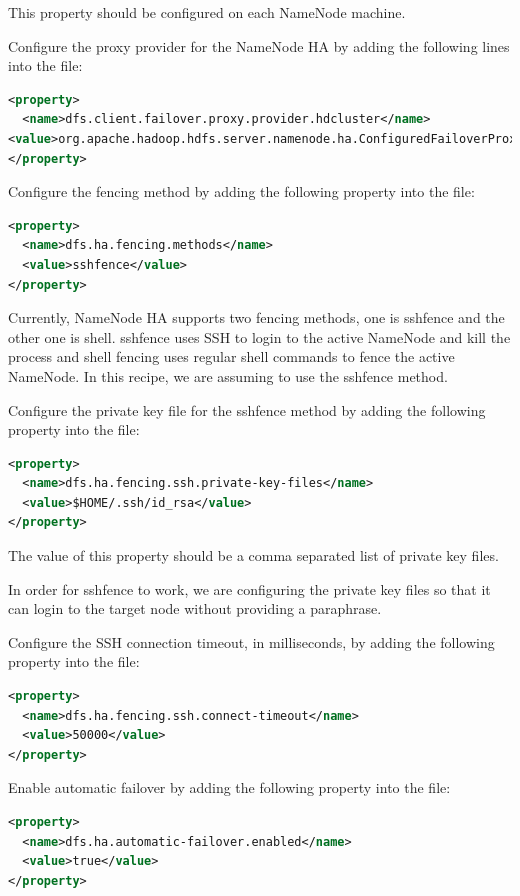 This property should be configured on each NameNode machine.

Configure the proxy provider for the NameNode HA by adding the following lines into the file:
\lstset{style=bashstyle}
\begin{lstlisting}[language=XML]
<property>
  <name>dfs.client.failover.proxy.provider.hdcluster</name>
<value>org.apache.hadoop.hdfs.server.namenode.ha.ConfiguredFailoverProxyProvider</value>
</property>
\end{lstlisting}

Configure the fencing method by adding the following property into the file:
\lstset{style=bashstyle}
\begin{lstlisting}[language=XML]
<property>
  <name>dfs.ha.fencing.methods</name>
  <value>sshfence</value>
</property>
\end{lstlisting}

Currently, NameNode HA supports two fencing methods, one is sshfence and the other one is shell. sshfence uses SSH to login to the active NameNode and kill the process and shell fencing uses regular shell commands to fence the active NameNode. In this recipe, we are assuming to use the sshfence method.

Configure the private key file for the sshfence method by adding the following property into the file:
\lstset{style=bashstyle}
\begin{lstlisting}[language=XML]
<property>
  <name>dfs.ha.fencing.ssh.private-key-files</name>
  <value>$HOME/.ssh/id_rsa</value>
</property>
\end{lstlisting}

The value of this property should be a comma separated list of private key files.

In order for sshfence to work, we are configuring the private key files so that it can login to the target node without providing a paraphrase.

Configure the SSH connection timeout, in milliseconds, by adding the following property into the file:
\lstset{style=bashstyle}
\begin{lstlisting}[language=XML]
<property>
  <name>dfs.ha.fencing.ssh.connect-timeout</name>
  <value>50000</value>
</property>
\end{lstlisting}

Enable automatic failover by adding the following property into the file:
\lstset{style=bashstyle}
\begin{lstlisting}[language=XML]
<property>
  <name>dfs.ha.automatic-failover.enabled</name>
  <value>true</value>
</property>
\end{lstlisting}

